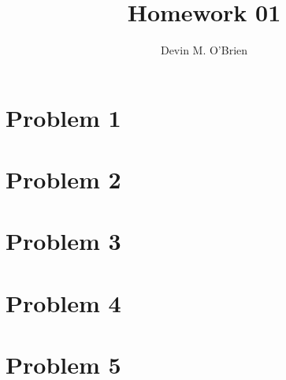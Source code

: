 \documentclass[12pt]{article}
\title{Homework 01}
\author{Devin M. O'Brien}
\begin{document}
\section{Problem 1}

\section{Problem 2}

\section{Problem 3}

\section{Problem 4}

\section{Problem 5}
\end{document}
